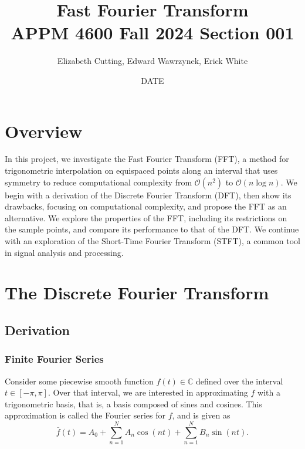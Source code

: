\documentclass[10pt]{article}
\title{%
    Fast Fourier Transform \\
    \large APPM 4600 Fall 2024 Section 001
}
\author{Elizabeth Cutting, Edward Wawrzynek, Erick White}
\date{DATE}
\begin{document}
\maketitle
\section{Overview} %
In this project, we investigate the Fast Fourier Transform (FFT), a method for trigonometric interpolation on equispaced points along an interval that uses symmetry to reduce computational complexity from $\mathcal{O}(n^2)$ to $\mathcal{O}(n\log n)$. We begin with a derivation of the Discrete Fourier Transform (DFT), then show its drawbacks, focusing on computational complexity, and propose the FFT as an alternative. We explore the properties of the FFT, including its restrictions on the sample points, and compare its performance to that of the DFT. We continue with an exploration of the Short-Time Fourier Transform (STFT), a common tool in signal analysis and processing.

\section{The Discrete Fourier Transform}
\subsection{Derivation}

\subsubsection{Finite Fourier Series}


Consider some piecewise smooth function \(f(t) \in \mathbb{C}\) defined over the interval \(t \in [-\pi, \pi]\). Over that interval, we are interested in approximating \(f\) with a trigonometric basis, that is, a basis composed of sines and cosines. This approximation is called the Fourier series for \(f\), and is given as \begin{equation}\label{eq:fourier_trig_series}
    \bar{f}(t) = A_0 + \sum_{n=1}^N A_n \cos  (nt) + \sum_{n=1}^N B_n \sin  (nt).
\end{equation}
\end{document}

